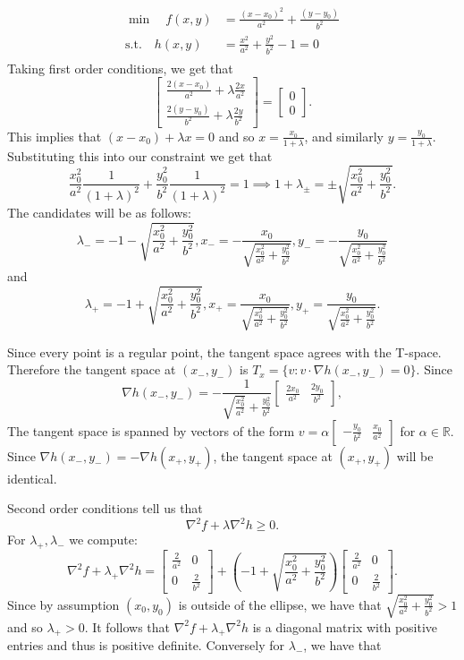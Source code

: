\documentclass[12pt, a4paper]{article}
\theoremstyle{definition}
\newcommand{\R}{\mathbb{R}}                           %
\newcommand{\grad}{\nabla}
\newcommand{\bmat}[1]{\begin{bmatrix}#1\end{bmatrix}}
\begin{document}
\begin{align*}
	\begin{aligned}
		\min \quad  f(x,y) & = \frac{(x-x_0)^2}{a^2} + \frac{(y-y_0)}{b^2}
		\\ \textrm{s.t.} \quad  h(x,y) &= \frac{x^2}{a^2} + \frac{y^2}{b^2} - 1 = 0 
	\end{aligned}
\end{align*}
Taking first order conditions, we get that
$$\bmat{\frac{2(x-x_0)}{a^2} + \lambda \frac{2x}{a^2} \\ \frac{2(y-y_0)}{b^2} + \lambda \frac{2y}{b^2}}  = \bmat{0 \\ 0 }.$$
This implies that $(x-x_0) + \lambda x = 0$ and so $x = \frac{x_0}{1+ \lambda}$, and similarly $y = \frac{y_0}{1+\lambda}$. Substituting this into our constraint we get that $$\frac{x_0^2}{a^2}\frac{1}{(1+\lambda)^2} + \frac{y_0^2}{b^2} \frac{1}{(1+\lambda)^2 } = 1 \implies 1+\lambda_\pm = \pm\sqrt{\frac{x_0^2}{a^2} + \frac{y_0^2}{b^2}}.$$
The candidates will be as follows: 
$$\lambda_- = -1-\sqrt{\frac{x_0^2}{a^2} + \frac{y_0^2}{b^2}} , x_- = -\frac{x_0}{\sqrt{\frac{x_0^2}{a^2} + \frac{y_0^2}{b^2}}} , y_- = - \frac{y_0}{\sqrt{\frac{x_0^2}{a^2} + \frac{y_0^2}{b^2}}}$$ 
and 
$$\lambda_+  = -1+ \sqrt{\frac{x_0^2}{a^2} + \frac{y_0^2}{b^2}} , x_+ = \frac{x_0}{\sqrt{\frac{x_0^2}{a^2} + \frac{y_0^2}{b^2}}}, y_+ = \frac{y_0}{\sqrt{\frac{x_0^2}{a^2} + \frac{y_0^2}{b^2}}}.$$
\item Since every point is a regular point, the tangent space agrees with the T-space. Therefore the tangent space at $(x_-,y_-)$ is $T_x = \{v : v \cdot \grad h(x_-,y_-) = 0\}$. Since $$\grad h(x_-,y_-) = -\frac{1}{\sqrt{\frac{x_0^2}{a^2}}+ \frac{y_0^2}{b^2}} \bmat{\frac{2x_0}{a^2} & \frac{2y_0}{b^2}},$$
The tangent space is spanned by vectors of the form $v = \alpha \bmat{-\frac{y_0}{b^2} & \frac{x_0}{a^2}}$ for $\alpha \in \R$. Since $\grad h(x_-,y_-) = - \grad h(x_+,y_+)$, the tangent space at $(x_+,y_+)$ will be identical. 
\item Second order conditions tell us that $$\grad^2 f + \lambda \grad^2 h \geq 0.$$
For $\lambda_+,\lambda_-$ we compute:
$$\grad^2 f + \lambda_+ \grad^2h = \bmat{\frac{2}{a^2} & 0 \\ 0 & \frac{2}{b^2}} +  \left(-1+ \sqrt{\frac{x_0^2}{a^2} + \frac{y_0^2}{b^2}} \right)\bmat{\frac{2}{a^2} & 0 \\ 0 & \frac{2}{b^2}}. $$
Since by assumption $(x_0,y_0)$ is outside of the ellipse, we have that $\sqrt{\frac{x_0^2}{a^2} + \frac{y_0^2}{b^2}} >1$ and so $\lambda_+ >0$. It follows that $\grad^2 f + \lambda_+ \grad^2h$ is a diagonal matrix with positive entries and thus is positive definite. Conversely for $\lambda_-$, we have that 
\end{document}
